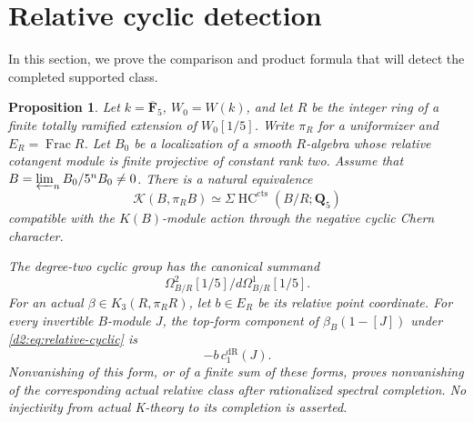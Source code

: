 \documentclass[11pt,a4paper]{amsart}
\numberwithin{equation}{section}
\newtheorem{proposition}[theorem]{Proposition}
\theoremstyle{definition}
\theoremstyle{remark}
\newcommand{\DtwoQQ}{\mathbf{Q}}
\newcommand{\DtwoFF}{\mathbf{F}}
\newcommand{\DtwocK}{\mathcal K}
\newcommand{\DtwodR}{\mathrm{dR}}
\newcommand{\Dtwocts}{\mathrm{cts}}
\DeclareMathOperator{\DtwoFrac}{Frac}
\DeclareMathOperator{\DtwoHC}{HC}
\begin{document}
\section{Relative cyclic detection}\label{d2:sec:cyclic}

In this section, we prove the comparison and product formula that will
detect the completed supported class.

\begin{proposition}\label{d2:prop:cyclic}
Let \(k=\overline{\DtwoFF}_5\), \(W_0=W(k)\), and let \(R\) be the
integer ring of a finite totally ramified extension of \(W_0[1/5]\).
Write \(\pi_R\) for a uniformizer and \(E_R=\DtwoFrac R\).
Let \(B_0\) be a localization of a smooth \(R\)-algebra whose relative
cotangent module is finite projective of constant rank two.
Assume that \(B=\varprojlim_nB_0/5^nB_0\ne0\).
There is a natural equivalence
\begin{equation}\label{d2:eq:relative-cyclic}
 \DtwocK(B,\pi_RB)\simeq\Sigma\DtwoHC^\Dtwocts(B/R;\DtwoQQ_5)
\end{equation}
compatible with the \(K(B)\)-module action through the negative cyclic
Chern character.

The degree-two cyclic group has the canonical summand
\[
 \Omega^2_{B/R}[1/5]\big/d\Omega^1_{B/R}[1/5].
\]
For an actual \(\beta\in K_3(R,\pi_RR)\), let \(b\in E_R\) be its
relative point coordinate. For every invertible \(B\)-module \(J\),
the top-form component of
\(\beta_B(1-[J])\) under \eqref{d2:eq:relative-cyclic} is
\[
 -b\,c_1^\DtwodR(J).
\]
Nonvanishing of this form, or of a finite sum of these forms, proves
nonvanishing of the corresponding actual relative class after
rationalized spectral completion. No injectivity from actual
K-theory to its completion is asserted.
\end{proposition}
\end{document}
